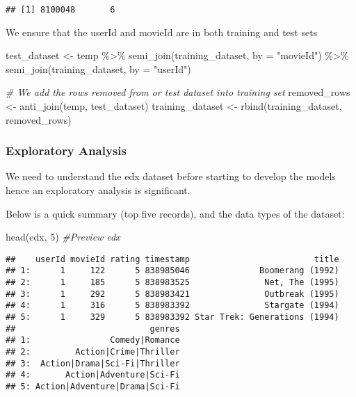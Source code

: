 \documentclass[
]{article}
\newenvironment{Shaded}{\begin{snugshade}}{\end{snugshade}}
\newcommand{\AttributeTok}[1]{\textcolor[rgb]{0.77,0.63,0.00}{#1}}
\newcommand{\CommentTok}[1]{\textcolor[rgb]{0.56,0.35,0.01}{\textit{#1}}}
\newcommand{\DecValTok}[1]{\textcolor[rgb]{0.00,0.00,0.81}{#1}}
\newcommand{\FunctionTok}[1]{\textcolor[rgb]{0.00,0.00,0.00}{#1}}
\newcommand{\NormalTok}[1]{#1}
\newcommand{\OtherTok}[1]{\textcolor[rgb]{0.56,0.35,0.01}{#1}}
\newcommand{\SpecialCharTok}[1]{\textcolor[rgb]{0.00,0.00,0.00}{#1}}
\newcommand{\StringTok}[1]{\textcolor[rgb]{0.31,0.60,0.02}{#1}}
\begin{document}
\begin{verbatim}
## [1] 8100048       6
\end{verbatim}

We ensure that the userId and movieId are in both training and test sets

\begin{Shaded}
\begin{Highlighting}[]
\NormalTok{test\_dataset }\OtherTok{\textless{}{-}}\NormalTok{ temp }\SpecialCharTok{\%\textgreater{}\%}
  \FunctionTok{semi\_join}\NormalTok{(training\_dataset, }\AttributeTok{by =} \StringTok{"movieId"}\NormalTok{) }\SpecialCharTok{\%\textgreater{}\%}
  \FunctionTok{semi\_join}\NormalTok{(training\_dataset, }\AttributeTok{by =} \StringTok{"userId"}\NormalTok{) }

\CommentTok{\# We add the rows removed from or test dataset into training set}
\NormalTok{removed\_rows }\OtherTok{\textless{}{-}} \FunctionTok{anti\_join}\NormalTok{(temp, test\_dataset)}
\NormalTok{training\_dataset }\OtherTok{\textless{}{-}} \FunctionTok{rbind}\NormalTok{(training\_dataset, removed\_rows)}
\end{Highlighting}
\end{Shaded}

\hypertarget{exploratory-analysis}{%
\subsubsection{Exploratory Analysis}\label{exploratory-analysis}}

We need to understand the edx dataset before starting to develop the
models hence an exploratory analysis is significant.

Below is a quick summary (top five records), and the data types of the
dataset:

\begin{Shaded}
\begin{Highlighting}[]
\FunctionTok{head}\NormalTok{(edx, }\DecValTok{5}\NormalTok{) }\CommentTok{\#Preview edx}
\end{Highlighting}
\end{Shaded}

\begin{verbatim}
##    userId movieId rating timestamp                         title
## 1:      1     122      5 838985046              Boomerang (1992)
## 2:      1     185      5 838983525               Net, The (1995)
## 3:      1     292      5 838983421               Outbreak (1995)
## 4:      1     316      5 838983392               Stargate (1994)
## 5:      1     329      5 838983392 Star Trek: Generations (1994)
##                           genres
## 1:                Comedy|Romance
## 2:         Action|Crime|Thriller
## 3:  Action|Drama|Sci-Fi|Thriller
## 4:       Action|Adventure|Sci-Fi
## 5: Action|Adventure|Drama|Sci-Fi
\end{verbatim}
\end{document}
